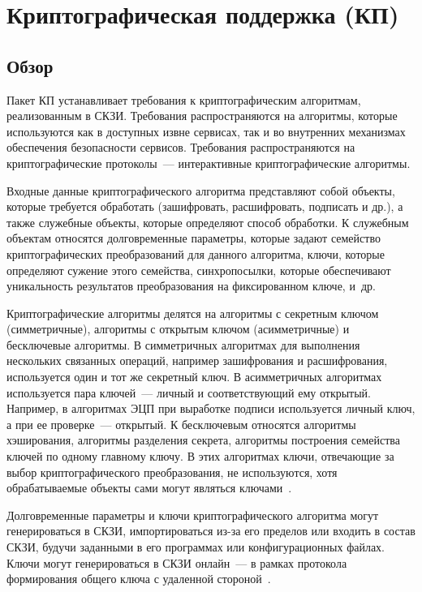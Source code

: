 \section{Криптографическая поддержка (КП)}\label{CS}

\subsection{Обзор}\label{CS.Intro}

Пакет КП устанавливает требования к криптографическим алгоритмам, реализованным
в СКЗИ.
%
Требования распространяются на алгоритмы, которые используются как в доступных
извне сервисах, так и во внутренних механизмах обеспечения безопасности
сервисов.
%
Требования распространяются на криптографические протоколы~---
интерактивные криптографические алгоритмы.

Входные данные криптографического алгоритма представляют собой объекты, которые
требуется обработать (зашифровать, расшифровать, подписать и др.), а также
служебные объекты, которые определяют способ обработки.
%
К служебным объектам относятся долговременные параметры, которые задают
семейство криптографических преобразований для данного алгоритма, ключи, которые
определяют сужение этого семейства, синхропосылки, которые 
обеспечивают уникальность результатов преобразования на фиксированном ключе, 
и~др. 


Криптографические алгоритмы делятся на алгоритмы с секретным ключом
(симметричные), алгоритмы с открытым ключом (асимметричные) и бесключевые
алгоритмы.
%
В симметричных алгоритмах для выполнения нескольких связанных операций, например
зашифрования и расшифрования, используется один и тот же секретный ключ.
%
В асимметричных алгоритмах используется пара ключей~--- личный и соответствующий
ему открытый. Например, в алгоритмах ЭЦП при выработке подписи используется
личный ключ, а при ее проверке~--- открытый.
%
К бесключевым относятся алгоритмы хэширования, алгоритмы разделения секрета,
алгоритмы построения семейства ключей по одному главному ключу. В этих
алгоритмах ключи, отвечающие за выбор криптографического преобразования, не
используются, хотя обрабатываемые объекты сами могут являться 
ключами~.

Долговременные параметры и ключи криптографического алгоритма
могут генерироваться в СКЗИ, импортироваться из-за его 
пределов или входить в состав СКЗИ, будучи заданными в его программах или 
конфигурационных файлах.
%
Ключи могут генерироваться в СКЗИ онлайн~--- в рамках протокола 
формирования общего ключа с удаленной стороной~.

